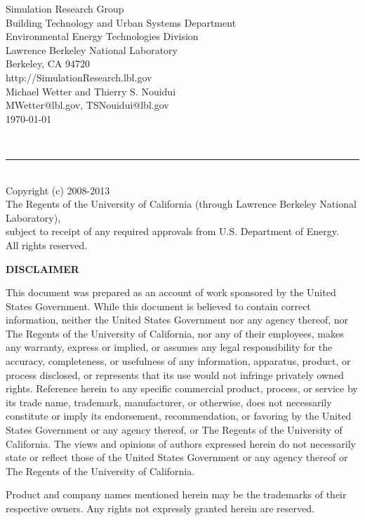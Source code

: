 \documentclass[11pt]{report}
\renewcommand{\date}{\today}
\begin{document}
\begin{titlepage}
\begin{minipage}{\headwidth}
\begin{center}
\large{Simulation Research Group}\\
\large{Building Technology and Urban Systems Department}\\
 \large{Environmental
Energy Technologies Division}\\
\large{Lawrence Berkeley National
Laboratory}\\
\large{Berkeley, CA 94720}
\\[10mm]
\large{http://SimulationResearch.lbl.gov}
\\[10mm]
\large{Michael Wetter and Thierry S. Nouidui}\\
\large{MWetter@lbl.gov, TSNouidui@lbl.gov}
\\[10mm]
\large{\date}
\\[40mm]
\end{center}
~\\[15mm]
\hrule
~\\[2mm]
Copyright (c) 2008-2013\\
The Regents of the University of California 
(through Lawrence Berkeley National Laboratory),\\
subject to receipt of any required approvals from U.S. Department of Energy.\\
All rights reserved.
\end{minipage}
\end{titlepage}

\begin{center}
\bf \Large DISCLAIMER
\end{center}
This document was prepared as an account of work sponsored by the United States
Government. While this document is believed to contain correct information, neither the
United States Government nor any agency thereof, nor The Regents of the University of
California, nor any of their employees, makes any warranty, express or implied, or assumes
any legal responsibility for the accuracy, completeness, or usefulness of any information,
apparatus, product, or process disclosed, or represents that its use would not infringe
privately owned rights. Reference herein to any specific commercial product, process, or
service by its trade name, trademark, manufacturer, or otherwise, does not necessarily
constitute or imply its endorsement, recommendation, or favoring by the United States
Government or any agency thereof, or The Regents of the University of California. The
views and opinions of authors expressed herein do not necessarily state or reflect those of the
United States Government or any agency thereof or The Regents of the University of
California.

\vfill
\small{\vspace{2mm} \noindent Product and company names mentioned herein may be the trademarks of their respective owners. Any rights not expressly granted herein are reserved.}
\end{document}
